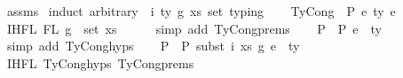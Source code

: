 \begin{isabellebody}
\isamarkupfalse%
\ assms\isanewline
{}\isamarkupfalse%
\ {\isacharparenleft}{\kern0pt}induct\ arbitrary{\isacharcolon}{\kern0pt}\ {\isasymGamma}{}\ i\ ty{}\ g{}\ xs\ set{\isacharcolon}{\kern0pt}\ typing{\isacharparenright}{\kern0pt}\isanewline
\isanewline
\ \ \isamarkupfalse%
\ {\isacharparenleft}{\kern0pt}TyCong\ {\isasymGamma}{\isacharprime}{\kern0pt}\ P\ e{}{\isacharprime}{\kern0pt}\ ty{\isacharprime}{\kern0pt}\ e{}{\isacharprime}{\kern0pt}{\isacharparenright}{\kern0pt}\isanewline
\isanewline
\ \ \isamarkupfalse%
\ IHFL{}{\isacharcolon}{\kern0pt}\ {\isachardoublequoteopen}FL\ g{}\ {\isacharequal}{\kern0pt}\ set\ xs{\isachardoublequoteclose}\isanewline
\ \ \ \ \isamarkupfalse%
\ {\isacharparenleft}{\kern0pt}simp\ add{\isacharcolon}{\kern0pt}\ TyCong{\isachardot}{\kern0pt}prems{\isacharparenleft}{\kern0pt}{}{\isacharparenright}{\kern0pt}{\isacharparenright}{\kern0pt}\isanewline
\isanewline
\ \ \isamarkupfalse%
\ P{}{\isacharcolon}{\kern0pt}\ {\isachardoublequoteopen}{\isasymGamma}{\isacharprime}{\kern0pt}\ {\isasymturnstile}{\isacharbraceleft}{\kern0pt}P{\isacharbraceright}{\kern0pt}\ e{}{\isacharprime}{\kern0pt}\ {\isacharcolon}{\kern0pt}\ ty{\isacharprime}{\kern0pt}{\isachardoublequoteclose}\isanewline
\ \ \ \ \isamarkupfalse%
\ {\isacharparenleft}{\kern0pt}simp\ add{\isacharcolon}{\kern0pt}\ TyCong{\isachardot}{\kern0pt}hyps{\isacharparenleft}{\kern0pt}{}{\isacharparenright}{\kern0pt}{\isacharparenright}{\kern0pt}\isanewline
\ \ \isamarkupfalse%
\ P{}{\isacharcolon}{\kern0pt}\ {\isachardoublequoteopen}{\isasymGamma}{}\ {\isasymturnstile}{\isacharbraceleft}{\kern0pt}P{\isacharbraceright}{\kern0pt}\ {\isacharparenleft}{\kern0pt}subst\ i\ xs\ g{}\ {\isacharparenleft}{\kern0pt}e{}{\isacharprime}{\kern0pt}{\isacharparenright}{\kern0pt}{\isacharparenright}{\kern0pt}\ {\isacharcolon}{\kern0pt}\ ty{\isacharprime}{\kern0pt}{\isachardoublequoteclose}\isanewline
\ \ \ \ \isamarkupfalse%
\ IHFL{}\ TyCong{\isachardot}{\kern0pt}hyps{\isacharparenleft}{\kern0pt}{}{\isacharparenright}{\kern0pt}\ TyCong{\isachardot}{\kern0pt}prems{\isacharparenleft}{\kern0pt}{}{\isacharcomma}{\kern0pt}{}{\isacharcomma}{\kern0pt}{}{\isacharcomma}{\kern0pt}{}{\isacharparenright}{\kern0pt}\ \isamarkupfalse%

\end{isabellebody}
